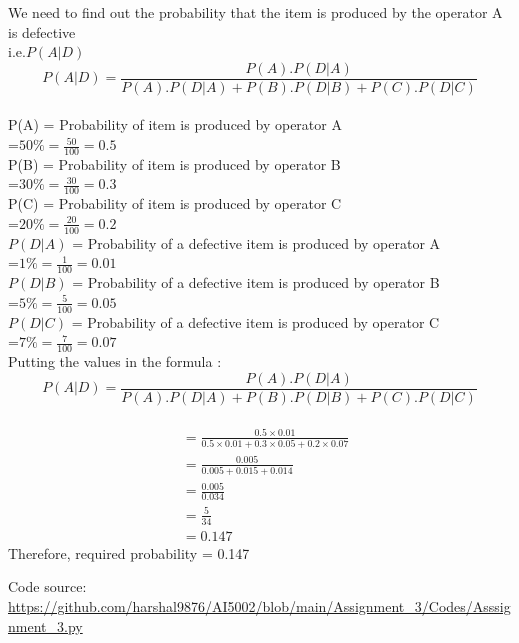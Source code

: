 \documentclass[journal,12pt,twocolumn]{IEEEtran}
\begin{document}
We need to find out the probability that the item is produced by the operator A is defective \\
 i.e.$P(A|D)$ \\
 $$P(A|D) = \frac{P(A).P(D|A)}{P(A).P(D|A) + P(B).P(D|B) + P(C).P(D|C)}$$ \\
 P(A) =  Probability of item is produced by operator A \\
 =$ 50\% = \frac{50}{100} = 0.5$ \\
  P(B) =  Probability of item is produced by operator B\\
 =$ 30\% = \frac{30}{100} = 0.3$ \\
  P(C) =  Probability of item is produced by operator C\\
 =$ 20\% = \frac{20}{100} = 0.2$ \\
  $P(D|A)$ =  Probability of a defective item is produced by operator A \\
 =$ 1\% = \frac{1}{100} = 0.01$ \\
  $P(D|B)$ =  Probability of a defective item is produced by operator B \\
 =$ 5\% = \frac{5}{100} = 0.05$ \\
  $P(D|C)$ =  Probability of a defective item is produced by operator C \\
 =$ 7\% = \frac{7}{100} = 0.07$ \\
 Putting the values in the formula :\\
  $$P(A|D) = \frac{P(A).P(D|A)}{P(A).P(D|A) + P(B).P(D|B) + P(C).P(D|C)}$$ \\
  \begin{align*}
&=\frac{0.5 \times 0.01}{0.5 \times 0.01 + 0.3 \times 0.05 + 0.2 \times 0.07}\\
&= \frac{0.005}{0.005 + 0.015 + 0.014 }\\
&=\frac{0.005}{0.034}\\
&=\frac{5}{34}\\
&=0.147
  \end{align*}
Therefore, required probability = 0.147 
\\
\begin{tcolorbox}
Code source: \url{https://github.com/harshal9876/AI5002/blob/main/Assignment_3/Codes/Asssignment_3.py}
\end{tcolorbox}
\\
\end{document}
